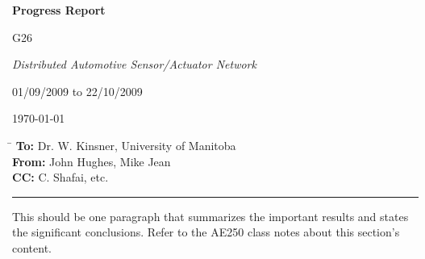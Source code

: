 \textwidth=6in
\textheight=8in
\topmargin=0.5in
\oddsidemargin=0.25in
\evensidemargin=0.25in
\headheight=0in
\footheight=0in
\headsep=0in


\centerline{\Large \bf Progress Report}
\bigskip
\bigskip

 G26
\bigskip

 {\it Distributed Automotive Sensor/Actuator Network}
\bigskip

 01/09/2009 to 22/10/2009
\bigskip

 \today

\begin{tabbing}
 \hspace{50pt}\=\kill
 {\bf To:} \> Dr. W. Kinsner, University of Manitoba \\ 
 {\bf From:} \> John Hughes, Mike Jean \\
 {\bf CC:} \> C. Shafai, etc.
\end{tabbing}

\hrule
\bigskip

 This should be one paragraph that summarizes the important results and states the significant conclusions. Refer to the AE250 class notes about this section's content.
\bigskip

\bigskip

\bigskip



